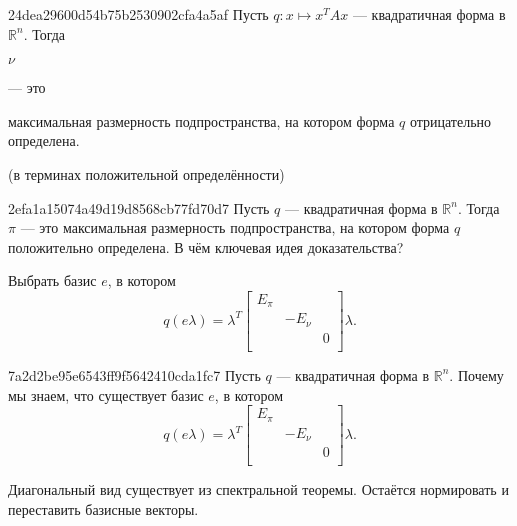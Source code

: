 \begin{note}{24dea29600d54b75b2530902cfa4a5af}
    Пусть \({ q : x \mapsto x^{T}Ax }\) --- квадратичная форма в \({ \mathbb R^{n} }\).
    Тогда \begin{icloze}{2}\({ \nu }\)\end{icloze} --- это \begin{icloze}{1}максимальная размерность подпространства, на котором форма \({ q }\) отрицательно определена.\end{icloze}

    \begin{center}
        \tiny
        (в терминах положительной определённости)
    \end{center}
\end{note}

\begin{note}{2efa1a15074a49d19d8568cb77fd70d7}
    Пусть \({ q }\) --- квадратичная форма в \({ \mathbb R^{n} }\).
    Тогда \({ \pi }\) --- это максимальная размерность подпространства, на котором форма \({ q }\) положительно определена.
    В чём ключевая идея доказательства?

    \begin{cloze}{1}
        Выбрать базис \({ e }\), в котором
        \[
            q(e\lambda) = \lambda^{T} \begin{bmatrix}
                E_{\pi}   \\
                & -E_{\nu} \\
                && 0      \\
            \end{bmatrix}
            \lambda.
        \]
    \end{cloze}
\end{note}

\begin{note}{7a2d2be95e6543ff9f5642410cda1fc7}
    Пусть \({ q }\) --- квадратичная форма в \({ \mathbb R^{n} }\).
    Почему мы знаем, что существует базис \({ e }\), в котором
    \[
        q(e\lambda) = \lambda^{T} \begin{bmatrix}
            E_{\pi}   \\
            & -E_{\nu} \\
            && 0      \\
        \end{bmatrix}
        \lambda.
    \]

    \begin{cloze}{1}
        Диагональный вид существует из спектральной теоремы. Остаётся нормировать и переставить базисные векторы.
    \end{cloze}
\end{note}

